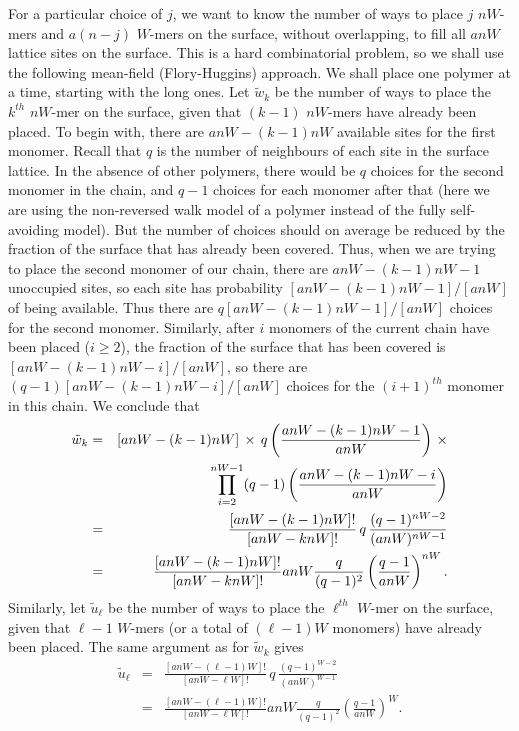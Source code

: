 \documentclass[journal=mamobx,manuscript=article]{achemso}
\begin{document}
For a particular choice of $j$, we want to know the number of ways to place $j$ $nW$-mers 
and $a(n-j)$ $W$-mers on the surface, without overlapping, to fill all $anW$ lattice sites on the surface.
This is a hard combinatorial problem, so we shall use the following mean-field (Flory-Huggins) approach.
We shall place one polymer at a time, starting with the long ones.
Let $\tilde{w}_k$ be the number of ways to place the $k^{th}$ $nW$-mer on the surface, given that
$(k-1)$ $nW$-mers have already been placed.  
To begin with, there are $anW-(k-1)nW$ available sites for the first monomer.  Recall that  $q$ is the number of
neighbours of each site in the surface lattice.
In the absence of other polymers, there would be $q$ choices for the second monomer in the chain,
and $q-1$ choices for each monomer after that (here we are using the non-reversed walk model of a polymer
instead of the fully self-avoiding model).  But the number of choices should on average be reduced 
by the fraction of the surface that has already been covered.  
Thus, when we are trying to place the second monomer of our chain, there are
$anW-(k-1)nW-1$ unoccupied sites, so each site has 
probability $[anW-(k-1)nW-1]/[anW]$ of being available.  
Thus there are $q[anW-(k-1)nW-1]/[anW]$ choices for the second monomer.  
Similarly, after $i$ monomers of the current chain have been placed ($i\geq 2$), the fraction of the
surface that has been covered is $[anW-(k-1)nW-i]/[anW]$, so there are 
$(q-1)[anW-(k-1)nW-i]/[anW]$ choices for the $(i+1)^{th}$ monomer in this chain.  
We conclude that 
\begin{eqnarray}
   \tilde{w}_k  & = &   [anW-(k-1)nW]\,\times \,q\left(\frac{ anW-(k-1)nW-1}{anW}\right)    \,\times
   \nonumber    \\
   & &    \hspace{22mm}
     \prod_{i=2}^{nW-1}(q-1)\left(\frac{ anW-(k-1)nW-i}{anW}\right)  
      \nonumber \\
 & = &    \frac{[anW-(k-1)nW]!}{[anW-knW]!} \,q\,  \frac{(q-1)^{nW-2}}{(anW)^{nW-1}}  
     \nonumber    \\
     & = &    \frac{[anW-(k-1)nW]!}{[anW-knW]!}   anW \frac{q}{(q-1)^2}\left(  \frac{q-1}{anW}\right)^{nW}.
     \label{eq.wk2}
\end{eqnarray}
Similarly, let $\tilde{u}_{\ell}$ be the number of ways to place the $\ell^{th}$ $W$-mer on the surface, given that
${\ell}-1$ $W$-mers (or a total of $(\ell-1)W$ monomers) have already been placed.   The same 
argument as for $\tilde{w}_k$ gives
\begin{eqnarray}
   \tilde{u}_{\ell}  
 & = &    \frac{[anW-(\ell-1)W]!}{[anW-\ell W]!} \,q\,  \frac{(q-1)^{W-2}}{(anW)^{W-1}}  
     \nonumber    \\
     & = &    \frac{[anW-(\ell-1)W]!}{[anW-\ell W]!}   anW \frac{q}{(q-1)^2}\left(  \frac{q-1}{anW}\right)^{W}.
     \label{eq.uell2}
\end{eqnarray}
\end{document}
